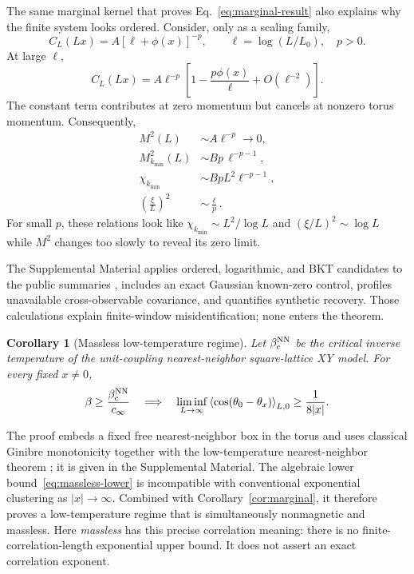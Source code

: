\documentclass[aps,prb,twocolumn,groupedaddress,amsmath,amssymb,
               superscriptaddress,nofootinbib,floatfix]{revtex4-2}
\theoremstyle{plain}
\newtheorem{corollary}{Corollary}
\theoremstyle{definition}
\newcommand{\kmin}{k_{\min}}
\begin{document}
The same marginal kernel that proves Eq.~\eqref{eq:marginal-result} also
explains why the finite system looks ordered.  Consider, only as a scaling
family,
\begin{equation}
 C_L(Lx)=A[\ell+\phi(x)]^{-p},
 \qquad
 \ell=\log(L/L_0),\quad p>0.
\end{equation}
At large $\ell$,
\begin{equation}
 C_L(Lx)=A\ell^{-p}
 \left[1-\frac{p\phi(x)}{\ell}+O(\ell^{-2})\right].
\end{equation}
The constant term contributes at zero momentum but cancels at nonzero torus
momentum.  Consequently,
\begin{align}
 M^2(L)&\sim A\ell^{-p}\to0,\\
 M_{\kmin}^2(L)&\sim Bp\,\ell^{-p-1},\\
 \chi_{\kmin}&\sim BpL^2\ell^{-p-1},\\
 \left(\frac{\xi}{L}\right)^2
 &\sim\frac{\ell}{p}.
\label{eq:finite-signatures}
\end{align}
For small $p$, these relations look like
$\chi_{\kmin}\sim L^2/\log L$ and
$(\xi/L)^2\sim\log L$ while $M^2$ changes too slowly to reveal its zero
limit.

The Supplemental Material applies ordered, logarithmic, and BKT candidates
to the public summaries \cite{YaoData2025}, includes an exact Gaussian
known-zero control, profiles unavailable cross-observable covariance, and
quantifies synthetic recovery.  Those calculations explain finite-window
misidentification; none enters the theorem.

\begin{corollary}[Massless low-temperature regime]
\label{cor:massless}
Let $\beta_c^{\rm NN}$ be the critical inverse temperature of the
unit-coupling nearest-neighbor square-lattice XY model.  For every fixed
$x\ne0$,
\begin{equation}
 \beta\ge\frac{\beta_c^{\rm NN}}{c_\infty}
 \quad\Longrightarrow\quad
 \liminf_{L\to\infty}
 \left\langle
 \cos(\theta_0-\theta_x)
 \right\rangle_{L,0}
 \ge\frac{1}{8|x|}.
\label{eq:massless-lower}
\end{equation}
\end{corollary}

The proof embeds a fixed free nearest-neighbor box in the torus and uses
classical Ginibre monotonicity together with the low-temperature
nearest-neighbor theorem \cite{Ginibre1970,VanEngelenburgLis2023}; it is
given in the Supplemental Material.  The algebraic lower
bound~\eqref{eq:massless-lower} is incompatible with conventional
exponential clustering as $|x|\to\infty$.  Combined with
Corollary~\ref{cor:marginal}, it therefore proves a low-temperature regime
that is simultaneously nonmagnetic and massless.  Here \emph{massless} has
this precise correlation meaning: there is no finite-correlation-length
exponential upper bound.  It does not assert an exact correlation exponent.
\end{document}
